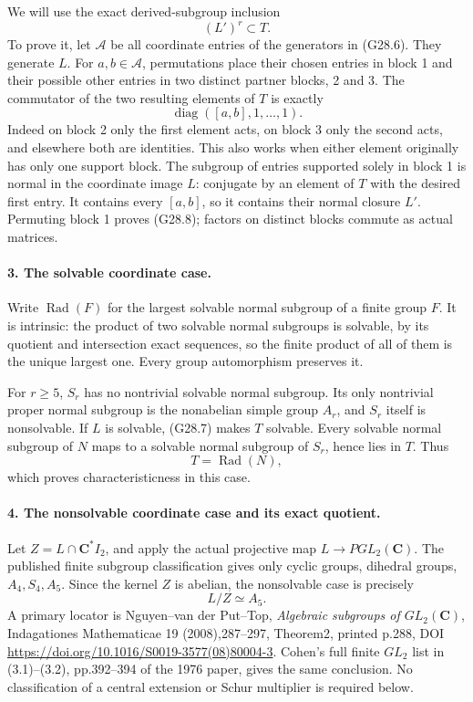 We will use the exact derived-subgroup inclusion
\[
                               (L')^r\subset T.             \tag{G28.8}
\]
To prove it, let \(\mathcal A\) be all coordinate entries of
the generators in (G28.6). They generate \(L\).
For \(a,b\in\mathcal A\), permutations place their chosen
entries in block 1 and their possible other entries in two
distinct partner blocks, 2 and 3. The commutator of the two
resulting elements of \(T\) is exactly
\[
                         \operatorname{diag}([a,b],1,\ldots,1).
                                                               \tag{G28.9}
\]
Indeed on block 2 only the first element acts, on block 3 only
the second acts, and elsewhere both are identities. This also
works when either element originally has only one support block.
The subgroup of entries supported solely in block 1 is normal
in the coordinate image \(L\): conjugate by an element of
\(T\) with the desired first entry. It contains every
\([a,b]\), so it contains their normal closure \(L'\).
Permuting block 1 proves (G28.8); factors on distinct blocks
commute as actual matrices.

\paragraph{3. The solvable coordinate case.}
Write \(\operatorname{Rad}(F)\) for the largest solvable
normal subgroup of a finite group \(F\). It is intrinsic:
the product of two solvable normal subgroups is solvable,
by its quotient and intersection exact sequences, so the
finite product of all of them is the unique largest one.
Every group automorphism preserves it.

For \(r\ge5\), \(S_r\) has no nontrivial solvable normal
subgroup. Its only nontrivial proper normal subgroup is the
nonabelian simple group \(A_r\), and \(S_r\) itself is
nonsolvable. If \(L\) is solvable, (G28.7) makes \(T\)
solvable. Every solvable normal subgroup of \(N\) maps to
a solvable normal subgroup of \(S_r\), hence lies in \(T\).
Thus
\[
                         T=\operatorname{Rad}(N),           \tag{G28.10}
\]
which proves characteristicness in this case.

\paragraph{4. The nonsolvable coordinate case and its exact quotient.}
Let \(Z=L\cap\mathbf C^*I_2\), and apply the actual
projective map \(L\to PGL_2(\mathbf C)\).
The published finite subgroup classification gives only
cyclic groups, dihedral groups, \(A_4,S_4,A_5\).
Since the kernel \(Z\) is abelian, the nonsolvable case
is precisely
\[
                               L/Z\simeq A_5.               \tag{G28.11}
\]
A primary locator is Nguyen--van der Put--Top,
\emph{Algebraic subgroups of \(GL_2(\mathbf C)\)},
Indagationes Mathematicae 19 (2008),287--297,
Theorem2, printed p.288, DOI
\url{https://doi.org/10.1016/S0019-3577(08)80004-3}.
Cohen's full finite \(GL_2\) list in (3.1)--(3.2),
pp.392--394 of the 1976 paper, gives the same conclusion.
No classification of a central extension or Schur multiplier
is required below.

